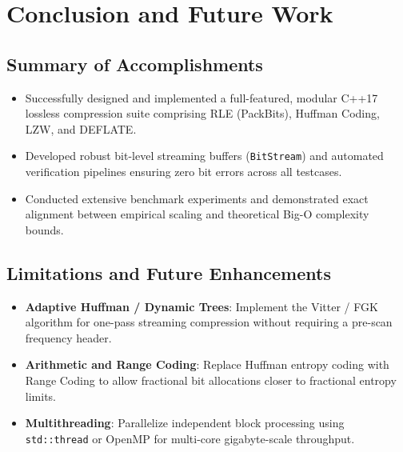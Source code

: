 \documentclass[12pt,a4paper]{article}
\begin{document}
\section{Conclusion and Future Work}

\subsection{Summary of Accomplishments}
\begin{itemize}
    \item Successfully designed and implemented a full-featured, modular C++17 lossless compression suite comprising RLE (PackBits), Huffman Coding, LZW, and DEFLATE.
    \item Developed robust bit-level streaming buffers (\texttt{BitStream}) and automated verification pipelines ensuring zero bit errors across all testcases.
    \item Conducted extensive benchmark experiments and demonstrated exact alignment between empirical scaling and theoretical Big-O complexity bounds.
\end{itemize}

\subsection{Limitations and Future Enhancements}
\begin{itemize}
    \item \textbf{Adaptive Huffman / Dynamic Trees}: Implement the Vitter / FGK algorithm for one-pass streaming compression without requiring a pre-scan frequency header.
    \item \textbf{Arithmetic and Range Coding}: Replace Huffman entropy coding with Range Coding to allow fractional bit allocations closer to fractional entropy limits.
    \item \textbf{Multithreading}: Parallelize independent block processing using \texttt{std::thread} or OpenMP for multi-core gigabyte-scale throughput.
\end{itemize}

\end{document}
